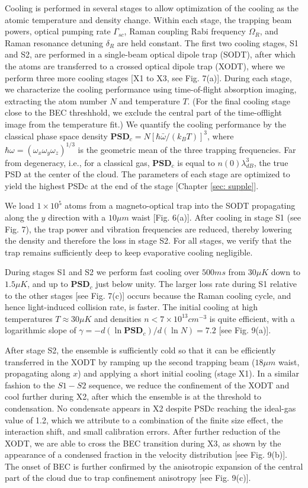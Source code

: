 \documentclass{article}
\begin{document}
Cooling is performed in several stages to allow optimization of the cooling as the atomic temperature and density change. Within each stage, the trapping beam powers, optical pumping rate $\Gamma_{sc}$, Raman coupling Rabi frequency $\Omega_R$, and Raman resonance detuning $\delta_R$ are held constant. The first two cooling stages, S1 and S2, are performed in a single-beam optical dipole trap (SODT), after which the atoms are transferred to a crossed optical dipole trap (XODT), where we perform three more cooling stages [X1 to X3, see Fig. 7(a)]. During each stage, we characterize the cooling performance using time-of-flight absorption imaging, extracting the atom number $N$ and temperature $T$. (For the final cooling stage close to the BEC threshhold, we exclude the central part of the time-offlight image from the temperature fit.) We quantify the cooling performance by the classical phase space density $\mathbf{PSD}_c = N[\hbar \bar{\omega} / (k_B T)]^3$, where $\hbar{\omega} = (\omega_x \omega_y \omega_z)^{1/3}$ is the geometric mean of the three trapping frequencies. Far from degeneracy, i.e., for a classical gas, $\mathbf{PSD}_c$ is equal to $n(0) \lambda_{dB}^3$, the true PSD at the center of the cloud. The parameters of each stage are optimized to yield the highest PSDc at the end of the stage [Chapter \ref{sec: supple}].

We load $1 \times 10^5$ atoms from a magneto-optical trap into the SODT propagating along the $y$ direction with a $10 \mu m$ waist [Fig. 6(a)]. After cooling in stage S1 (see Fig. 7), the trap power and vibration frequencies are reduced, thereby lowering the density and therefore the loss in stage S2. For all stages, we verify that the trap remains sufficiently deep to keep evaporative cooling negligible.

During stages S1 and S2 we perform fast cooling over $500 ms$ from $30 \mu K$ down to $1.5 \mu K$, and up to $\mathbf{PSD}_c$ just below unity. The larger loss rate during S1 relative to the other stages [see Fig. 7(c)] occurs because the Raman cooling cycle, and hence light-induced collision rate, is faster. The initial cooling at high temperatures $T \approx 30 \mu K$ and densities $n < 7 \times 10^{13} cm^{-3}$ is quite efficient, with a logarithmic slope of $\gamma = -d(\ln \mathbf{PSD}_c)/d(\ln N) = 7.2$ [see Fig. 9(a)].

After stage S2, the ensemble is sufficiently cold so that it can be efficiently transferred in the XODT by ramping up the second trapping beam ($18 \mu m$ waist, propagating along $x$) and applying a short initial cooling (stage X1). In a similar fashion to the $S1-S2$ sequence, we reduce the confinement of the XODT and cool further during X2, after which the ensemble is at the threshold to condensation. No condensate appears in X2 despite PSDc reaching the ideal-gas value of 1.2, which we attribute to a combination of the finite size effect, the interaction shift, and small calibration errors. After further reduction of the XODT, we are able to cross the BEC transition during X3, as shown by the appearance of a condensed fraction in the velocity distribution [see Fig. 9(b)]. The onset of BEC is further confirmed by the anisotropic expansion of the central part of the cloud due to trap confinement anisotropy [see Fig. 9(c)].
\end{document}
